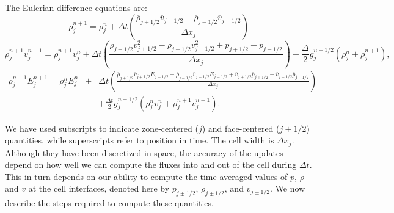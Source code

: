 The Eulerian difference equations are:
%
\newcommand{\avp}[1]{\overline{#1}_{j+1/2}}
\newcommand{\avm}[1]{\overline{#1}_{j-1/2}}
\begin{equation}
\rho_j^{n+1} = \rho_j^{n} + \Delta t \left( 
                      \frac{ \avp{\rho}\avp{v} -  \avm{\rho}\avm{v} } {\Delta x_j}
            \right)
     \label{eq:mass_diff}
\end{equation}
\begin{equation}
\rho_j^{n+1} v_{j}^{n+1} =
       \rho_j^{n+1} v_j^n  + \Delta t \left(
          \frac{ \avp{\rho} \avp{v}^2 - \avm{\rho} \avm{v}^2 + \avp{p} - \avm{p}} {\Delta x_j}
             \right)
     + \frac{ \Delta }{2} g_j^{n+1/2} (\rho_j^n + \rho_j^{n+1}), 
     \label{eq:momentum_diff}
\end{equation}
\begin{eqnarray}
\rho_j^{n+1} E_j^{n+1}  = 
       \rho_j^n E_j^n  & + & \Delta t  \left(
            \frac{  \avp{\rho} \avp{v} \avp{E}  - \avm{\rho} \avm{v} \avm{E}  +
                       \avp{v} \avp{p}    - \avm{v} \avm{p} } {\Delta x_j}
             \right) \nonumber \\
         & & + \frac{ \Delta t }{2} g_j^{n+1/2} (\rho_j^n v_j^n + \rho_j^{n+1} v_j^{n+1} ).
     \label{eq:energy_diff}
\end{eqnarray}

We have used subscripts to indicate zone-centered ($j$)
and face-centered ($j+1/2$) quantities, while superscripts refer to
position in time.  The cell width is $\Delta x_j$.
Although they have been discretized
in space, the accuracy of the updates depend on how well we can compute
the fluxes into and out of the cell during $\Delta t$.  
This in turn depends on our ability to compute the time-averaged 
values of $p$, $\rho$ and $v$ at the cell interfaces, denoted here
by $\overline{p}_{j\pm 1/2}$, $\overline{\rho}_{j\pm 1/2}$, and $\overline{v}_{j\pm 1/2}$.  We now
describe the steps required to compute these quantities.

